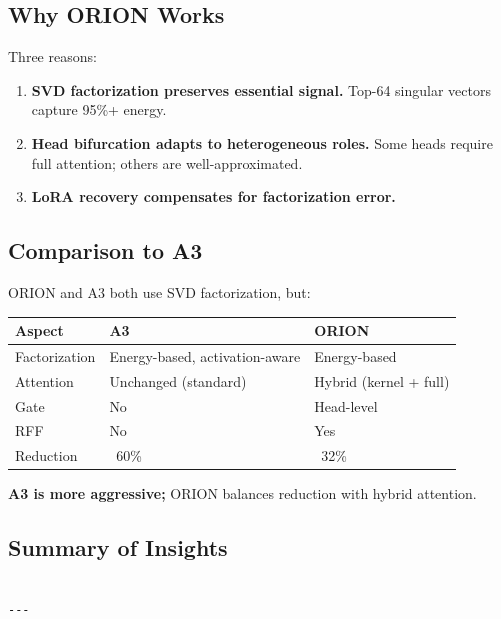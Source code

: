 \subsection{Why ORION Works}

Three reasons:

\begin{enumerate}
\item \textbf{SVD factorization preserves essential signal.} Top-64 singular
  vectors capture 95\%+ energy.
\item \textbf{Head bifurcation adapts to heterogeneous roles.} Some heads
  require full attention; others are well-approximated.
\item \textbf{LoRA recovery compensates for factorization error.}

\end{enumerate}
\subsection{Comparison to A3}

ORION and A3 both use SVD factorization, but:

\begin{table}[H]
\centering
\small
\begin{tabular}{lll}
\toprule
\textbf{Aspect} & \textbf{A3} & \textbf{ORION} \\
\midrule
Factorization & Energy-based, activation-aware & Energy-based \\
Attention & Unchanged (standard) & Hybrid (kernel + full) \\
Gate & No & Head-level \\
RFF & No & Yes \\
Reduction & ~60\% & ~32\% \\
\bottomrule
\end{tabular}
\end{table}

\textbf{A3 is more aggressive;} ORION balances reduction with hybrid attention.

\subsection{Summary of Insights}

\begin{lstlisting}

---
\end{lstlisting}